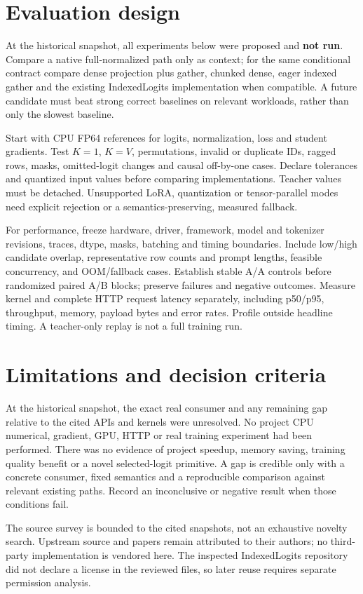 \documentclass[11pt,a4paper]{article}
\begin{document}
\section{Evaluation design}
At the historical snapshot, all experiments below were proposed and \textbf{not run}. Compare a native full-normalized path only as context; for the same conditional contract compare dense projection plus gather, chunked dense, eager indexed gather and the existing IndexedLogits implementation when compatible. A future candidate must beat strong correct baselines on relevant workloads, rather than only the slowest baseline.

Start with CPU FP64 references for logits, normalization, loss and student gradients. Test $K=1$, $K=V$, permutations, invalid or duplicate IDs, ragged rows, masks, omitted-logit changes and causal off-by-one cases. Declare tolerances and quantized input values before comparing implementations. Teacher values must be detached. Unsupported LoRA, quantization or tensor-parallel modes need explicit rejection or a semantics-preserving, measured fallback.

For performance, freeze hardware, driver, framework, model and tokenizer revisions, traces, dtype, masks, batching and timing boundaries. Include low/high candidate overlap, representative row counts and prompt lengths, feasible concurrency, and OOM/fallback cases. Establish stable A/A controls before randomized paired A/B blocks; preserve failures and negative outcomes. Measure kernel and complete HTTP request latency separately, including p50/p95, throughput, memory, payload bytes and error rates. Profile outside headline timing. A teacher-only replay is not a full training run.
\section{Limitations and decision criteria}
At the historical snapshot, the exact real consumer and any remaining gap relative to the cited APIs and kernels were unresolved. No project CPU numerical, gradient, GPU, HTTP or real training experiment had been performed. There was no evidence of project speedup, memory saving, training quality benefit or a novel selected-logit primitive. A gap is credible only with a concrete consumer, fixed semantics and a reproducible comparison against relevant existing paths. Record an inconclusive or negative result when those conditions fail.

The source survey is bounded to the cited snapshots, not an exhaustive novelty search. Upstream source and papers remain attributed to their authors; no third-party implementation is vendored here. The inspected IndexedLogits repository did not declare a license in the reviewed files, so later reuse requires separate permission analysis.
\end{document}
